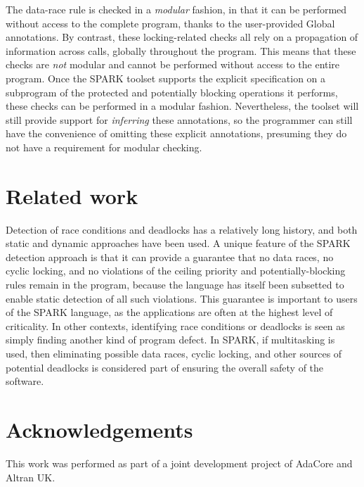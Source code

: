 \documentclass[conference,compsoc]{IEEEtran}
\begin{document}
The data-race rule is checked in a \emph{modular} fashion, in that it can
be performed without access to the complete program, thanks to the
user-provided Global annotations. By contrast, these locking-related checks
all rely on a propagation of information across calls, globally throughout
the program. This means that these checks are \emph{not} modular and cannot
be performed without access to the entire program. Once the SPARK toolset
supports the explicit specification on a subprogram of the protected and
potentially blocking operations it performs, these checks can be performed
in a modular fashion. Nevertheless, the toolset will still provide support
for \emph{inferring} these annotations, so the programmer can still have
the convenience of omitting these explicit annotations, presuming they do
not have a requirement for modular checking.

\section{Related work}
Detection of race conditions and deadlocks has a relatively long history,
and both static \cite{engler2003racerx} and dynamic \cite{yu2005racetrack}
approaches have been used. A unique feature of the SPARK detection approach
is that it can provide a guarantee that no data races, no cyclic locking,
and no violations of the ceiling priority and potentially-blocking rules
remain in the program, because the language has itself been subsetted to
enable static detection of all such violations. This guarantee is important
to users of the SPARK language, as the applications are often at the
highest level of criticality. In other contexts, identifying race
conditions or deadlocks is seen as simply finding another kind of program
defect. In SPARK, if multitasking is used, then eliminating possible data
races, cyclic locking, and other sources of potential deadlocks is
considered part of ensuring the overall safety of the software.


\section*{Acknowledgements}
This work was performed as part of a joint development project of AdaCore
and Altran UK.



\end{document}
